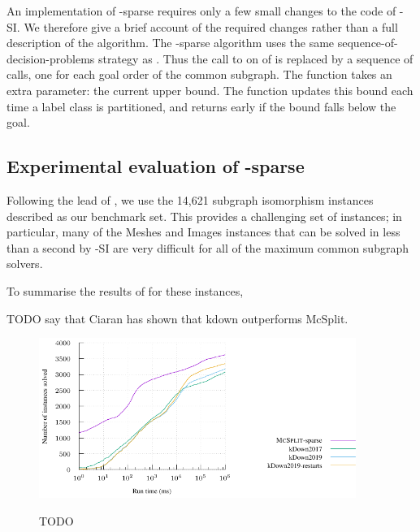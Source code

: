 An implementation of \McSplit-sparse
requires only a few small changes to the code of \McSplit-SI. We
therefore give a brief account of the required changes rather than a full
description of the algorithm.  The \McSplit-sparse algorithm uses the same
sequence-of-decision-problems strategy as \McSplitDown. Thus the call to
 on  of 
is replaced by a sequence of calls, one for each goal order of the common
subgraph.  The  function takes an extra parameter: the current
upper bound. The  function updates this bound each time a label
class is partitioned, and returns early if the bound falls below the goal.

\subsection{Experimental evaluation of \McSplit-sparse}

Following the lead of \cite{DBLP:conf/cpaior/ArchibaldDHMP019},
we use the 14,621 subgraph isomorphism instances described
 as our benchmark set.
This provides a challenging set of instances; in particular,
many of the Meshes and Images instances that can be solved in less
than a second by \McSplit-SI are very difficult for all of the maximum
common subgraph solvers.

To summarise the results of \cite{DBLP:conf/cpaior/ArchibaldDHMP019}
for these instances, 

TODO say that Ciaran has shown that kdown outperforms McSplit.


\begin{figure}[htb]
    \centering
    \caption{TODO}
    \includegraphics*[width=0.92\textwidth]{14b-mcsplit-induced-si/sip-instances-mcis-experiment/experiment/plots/cumulative.pdf}
    \label{figure:mcsplit-sparse-cumulative}
\end{figure}

